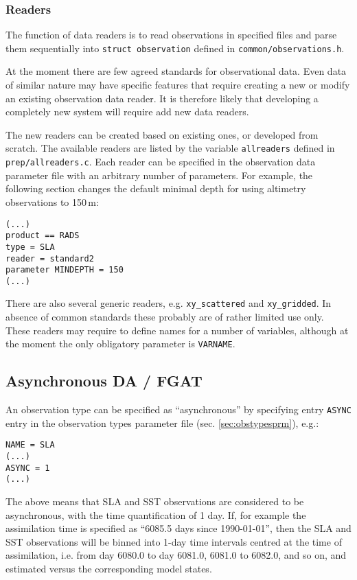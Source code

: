\documentclass[11pt]{report}
\begin{document}
\subsubsection{Readers}

The function of data readers is to read observations in specified files and parse them sequentially into \verb|struct observation| defined in \verb|common/observations.h|.

At the moment there are few agreed standards for observational data.
Even data of similar nature may have specific features that require creating a new or modify an existing observation data reader.
It is therefore likely that developing a completely new system will require add new data readers.

The new readers can be created based on existing ones, or developed from scratch.
The available readers are listed by the variable \verb|allreaders| defined in \verb|prep/allreaders.c|.
Each reader can be specified in the observation data parameter file with an arbitrary number of parameters.
For example, the following section changes the default minimal depth for using altimetry observations to 150\,m:
\begin{Verbatim}
(...)
product == RADS
type = SLA
reader = standard2
parameter MINDEPTH = 150
(...)
\end{Verbatim}

There are also several generic readers, e.g. \verb|xy_scattered| and \verb|xy_gridded|.
In absence of common standards these probably are of rather limited use only.
These readers may require to define names for a number of variables, although at the moment the only obligatory parameter is \verb|VARNAME|.

\subsection{Asynchronous DA / FGAT}
\label{sec:async}

An observation type can be specified as ``asynchronous'' by specifying entry \verb|ASYNC| entry in the observation types parameter file (sec. \ref{sec:obstypesprm}), e.g.:
\begin{Verbatim}[frame=single,fontsize=\footnotesize]
NAME = SLA
(...)
ASYNC = 1
(...)
\end{Verbatim}
The above means that SLA and SST observations are considered to be asynchronous, with the time quantification of 1 day.
If, for example the assimilation time is specified as ``6085.5 days since 1990-01-01'', then the SLA and SST observations will be binned into 1-day time intervals centred at the time of assimilation, i.e. from day 6080.0 to day 6081.0, 6081.0 to 6082.0, and so on, and estimated versus the corresponding model states.
\end{document}
